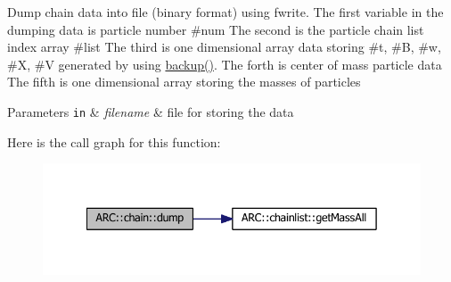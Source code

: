 Dump chain data into file (binary format) using fwrite. The first variable in the dumping data is particle number \#num The second is the particle chain list index array \#list The third is one dimensional array data storing \#t, \#B, \#w, \#X, \#V generated by using \hyperlink{classARC_1_1chain_a3ad5d3a5a2e899ec55bd4aafaa18c2d2}{backup()}. The forth is center of mass particle data The fifth is one dimensional array storing the masses of particles 
\begin{DoxyParams}[1]{Parameters}
\mbox{\tt in}  & {\em filename} & file for storing the data \\
\hline
\end{DoxyParams}
Here is the call graph for this function\+:
\nopagebreak
\begin{figure}[H]
\begin{center}
\leavevmode
\includegraphics[width=342pt]{classARC_1_1chain_a6caef2b2dc81cc944377a3ea511c0fe8_cgraph}
\end{center}
\end{figure}
\hypertarget{classARC_1_1chain_acd19e23d46d38d66c5eb60a2e9afe727}{}\label{classARC_1_1chain_acd19e23d46d38d66c5eb60a2e9afe727} 

